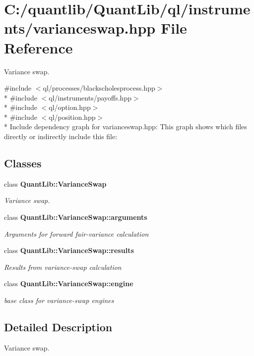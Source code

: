 \section{C\+:/quantlib/\+Quant\+Lib/ql/instruments/varianceswap.hpp File Reference}
\label{varianceswap_8hpp}


Variance swap.  


{\ttfamily \#include $<$ql/processes/blackscholesprocess.\+hpp$>$}\\*
{\ttfamily \#include $<$ql/instruments/payoffs.\+hpp$>$}\\*
{\ttfamily \#include $<$ql/option.\+hpp$>$}\\*
{\ttfamily \#include $<$ql/position.\+hpp$>$}\\*
Include dependency graph for varianceswap.\+hpp\+:
This graph shows which files directly or indirectly include this file\+:
\subsection*{Classes}
\begin{DoxyCompactItemize}
\item 
class {\bf Quant\+Lib\+::\+Variance\+Swap}
\begin{DoxyCompactList}\small\item\em Variance swap. \end{DoxyCompactList}\item 
class {\bf Quant\+Lib\+::\+Variance\+Swap\+::arguments}
\begin{DoxyCompactList}\small\item\em Arguments for forward fair-\/variance calculation \end{DoxyCompactList}\item 
class {\bf Quant\+Lib\+::\+Variance\+Swap\+::results}
\begin{DoxyCompactList}\small\item\em Results from variance-\/swap calculation \end{DoxyCompactList}\item 
class {\bf Quant\+Lib\+::\+Variance\+Swap\+::engine}
\begin{DoxyCompactList}\small\item\em base class for variance-\/swap engines \end{DoxyCompactList}\end{DoxyCompactItemize}


\subsection{Detailed Description}
Variance swap. 

